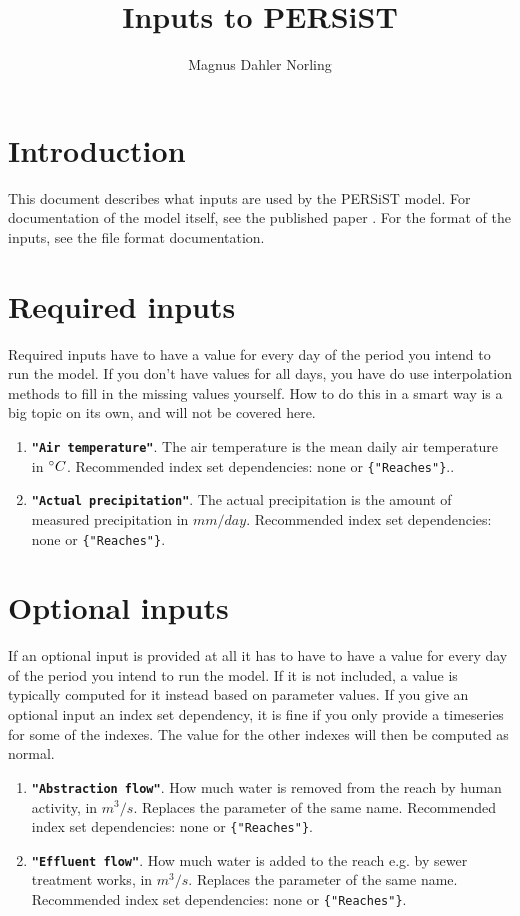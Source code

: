 \documentclass[11pt]{article}
\title{Inputs to PERSiST}
\author{Magnus Dahler Norling}
\theoremstyle{definition}
\begin{document}
\maketitle


\section{Introduction}

This document describes what inputs are used by the PERSiST model. For documentation of the model itself, see the published paper \cite{futter14}. For the format of the inputs, see the file format documentation.

\section{Required inputs}

Required inputs have to have a value for every day of the period you intend to run the model. If you don't have values for all days, you have do use interpolation methods to fill in the missing values yourself. How to do this in a smart way is a big topic on its own, and will not be covered here.

\begin{enumerate}[i]
\item {\bf\tt "Air temperature"}. The air temperature is the mean daily air temperature in $\degree C$. Recommended index set dependencies: none or {\tt \{"Reaches"\}}..
\item {\bf\tt "Actual precipitation"}. The actual precipitation is the amount of measured precipitation in $mm/day$. Recommended index set dependencies: none or {\tt \{"Reaches"\}}.
\end{enumerate}

\section{Optional inputs}

If an optional input is provided at all it has to have to have a value for every day of the period you intend to run the model. If it is not included, a value is typically computed for it instead based on parameter values. If you give an optional input an index set dependency, it is fine if you only provide a timeseries for some of the indexes. The value for the other indexes will then be computed as normal.

\begin{enumerate}[i]
\item {\bf\tt "Abstraction flow"}. How much water is removed from the reach by human activity, in $m^3/s$. Replaces the parameter of the same name. Recommended index set dependencies: none or {\tt \{"Reaches"\}}.
\item {\bf\tt "Effluent flow"}. How much water is added to the reach e.g. by sewer treatment works, in $m^3/s$. Replaces the parameter of the same name. Recommended index set dependencies: none or {\tt \{"Reaches"\}}.
\end{enumerate}



\end{document}
